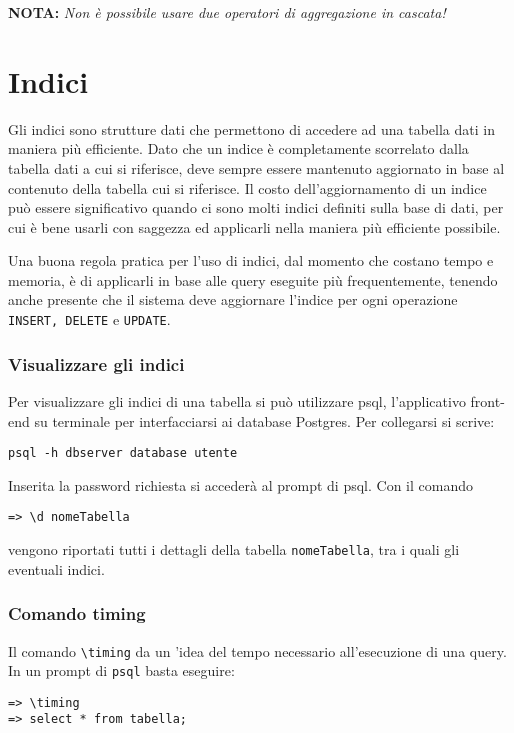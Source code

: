 \documentclass[a4paper, 10pt, titlepage]{article}
\begin{document}
		\noindent
		\textbf{NOTA: } \textit{Non è possibile usare due operatori di aggregazione in cascata!}
	\newpage		
	\section{Indici}
	Gli indici sono strutture dati che permettono di accedere ad una tabella dati in maniera più efficiente. Dato che un indice è completamente scorrelato dalla tabella dati a cui si riferisce, deve sempre essere mantenuto aggiornato in base al contenuto della tabella cui si riferisce. Il costo dell'aggiornamento di un indice può essere significativo quando ci sono molti indici definiti sulla base di dati, per cui è bene usarli con saggezza ed applicarli nella maniera più efficiente possibile.
	
	Una buona regola pratica per l'uso di indici, dal momento che costano tempo e memoria, è di applicarli in base alle query eseguite più frequentemente, tenendo anche presente che il sistema deve aggiornare l'indice per ogni operazione \lstinline|INSERT, DELETE| e \lstinline|UPDATE|.
	
	\subsubsection{Visualizzare gli indici}
	Per visualizzare gli indici di una tabella si può utilizzare psql, l'applicativo front-end su terminale per interfacciarsi ai database Postgres. Per collegarsi si scrive:
	\begin{lstlisting}
psql -h dbserver database utente
	\end{lstlisting}
	Inserita la password richiesta si accederà al prompt di psql. Con il comando
	\begin{lstlisting}
=> \d nomeTabella
	\end{lstlisting}
	vengono riportati tutti i dettagli della tabella \lstinline|nomeTabella|, tra i quali gli eventuali indici.
	
	\subsubsection{Comando timing}
	Il comando \lstinline|\timing| da un 'idea del tempo necessario all'esecuzione di una query.
	In un prompt di \verb|psql| basta eseguire:
	\begin{lstlisting}
=> \timing
=> select * from tabella;
	\end{lstlisting}
\end{document}
